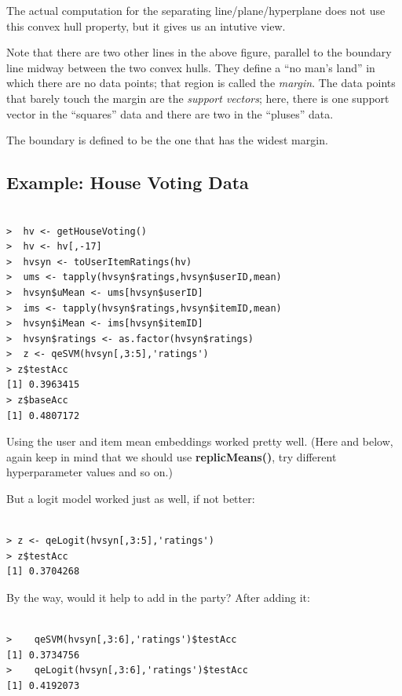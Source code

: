 The actual computation for the separating line/plane/hyperplane does not
use this convex hull property, but it gives us an intutive view.

Note that there are two other lines in the above figure, parallel to the
boundary line midway between the two convex hulls.  They define a ``no
man's land'' in which there are no data points; that region is called
the \textit{margin}.  The data points that barely touch the margin are
the \textit{support vectors}; here, there is one support vector in the
``squares'' data and there are two in the ``pluses'' data.

The boundary is defined to be the one that has the widest margin.

\subsection{Example:  House Voting Data}

\begin{lstlisting}

>  hv <- getHouseVoting()
>  hv <- hv[,-17]
>  hvsyn <- toUserItemRatings(hv)
>  ums <- tapply(hvsyn$ratings,hvsyn$userID,mean)
>  hvsyn$uMean <- ums[hvsyn$userID]
>  ims <- tapply(hvsyn$ratings,hvsyn$itemID,mean)
>  hvsyn$iMean <- ims[hvsyn$itemID]
>  hvsyn$ratings <- as.factor(hvsyn$ratings)
>  z <- qeSVM(hvsyn[,3:5],'ratings')
> z$testAcc
[1] 0.3963415
> z$baseAcc
[1] 0.4807172
\end{lstlisting}

Using the user and item mean embeddings worked pretty well.  (Here and
below, again keep in mind that we should use \textbf{replicMeans()}, try
different hyperparameter values and so on.)

But a logit model worked just as well, if not better:

\begin{lstlisting}

> z <- qeLogit(hvsyn[,3:5],'ratings')
> z$testAcc
[1] 0.3704268

\end{lstlisting}

By the way, would it help to add in the party?  After adding it:

\begin{lstlisting}

>    qeSVM(hvsyn[,3:6],'ratings')$testAcc
[1] 0.3734756
>    qeLogit(hvsyn[,3:6],'ratings')$testAcc
[1] 0.4192073
\end{lstlisting}

